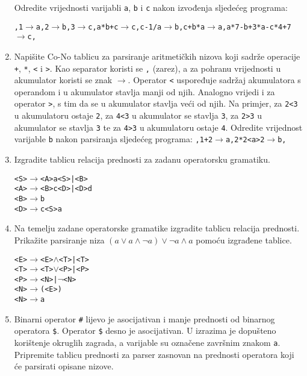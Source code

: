 \documentclass[times, 12pt, utf8]{book}
\begin{document}
\begin{enumerate}[resume]
Odredite vrijednosti varijabli \texttt{a}, \texttt{b} i \texttt{c} nakon izvođenja sljedećeg programa:

\texttt{,1\(\to\)a,2\(\to\)b,3\(\to\)c,a*b+c\(\to\)c,c-1/a\(\to\)b,c+b*a\(\to\)a,a*7-b+3*a-c*4+7\(\to\)c,} \cite[str.~83-84]{udzbenik} \cite{auditorne}

\item
Napišite Co-No tablicu za parsiranje aritmetičkih nizova koji sadrže operacije \texttt{+}, \texttt{*}, \texttt{<} i \texttt{>}.
Kao separator koristi se \texttt{,} (zarez), a za pohranu vrijednosti u akumulator koristi se znak \texttt{\(\to\)}.
Operator \texttt{<} uspoređuje sadržaj akumulatora s operandom i u akumulator stavlja manji od njih.
Analogno vrijedi i za operator \texttt{>}, s tim da se u akumulator stavlja veći od njih.
Na primjer, za \texttt{2<3} u akumulatoru ostaje \texttt{2}, za \texttt{4<3} u akumulator se stavlja \texttt{3}, za \texttt{2>3} u akumulator se stavlja \texttt{3} te za \texttt{4>3} u akumulatoru ostaje \texttt{4}.
Odredite vrijednost varijable \texttt{b} nakon parsiranja sljedećeg programa: \texttt{,1+2\(\to\)a,2*2<a>2\(\to\)b,}  \cite[str.~83-84]{udzbenik} \cite{auditorne}

\item
Izgradite tablicu relacija prednosti za zadanu operatorsku gramatiku. \cite[str.~133-135]{udzbenik}

\begin{alltt}
<S> \(\to\) <A>a<S> | <B>
<A> \(\to\) <B>c<D> | <D>d
<B> \(\to\) b
<D> \(\to\) c<S>a
\end{alltt} 

\item
Na temelju zadane operatorske gramatike izgradite tablicu relacija prednosti. Prikažite parsiranje niza \( (a \vee a \wedge \lnot a) \vee \lnot a \wedge a \) pomoću izgrađene tablice. \cite[str.~133-135]{udzbenik}

\begin{alltt}
<E> \(\to\) <E> \(\wedge\) <T> | <T>
<T> \(\to\) <T> \(\vee\) <P> | <P>
<P> \(\to\) <N> | \(\lnot\)<N>
<N> \(\to\) ( <E> )
<N> \(\to\) a
\end{alltt} 

\item
Binarni operator \texttt{\#} lijevo je asocijativan i manje prednosti od binarnog operatora \texttt{\$}.
Operator \texttt{\$} desno je asocijativan.
U izrazima je dopušteno korištenje okruglih zagrada, a varijable su označene završnim znakom \texttt{a}.
Pripremite tablicu prednosti za parser zasnovan na prednosti operatora koji će parsirati opisane nizove. \cite[str.~135-136]{udzbenik}


\end{enumerate}
\end{document}
